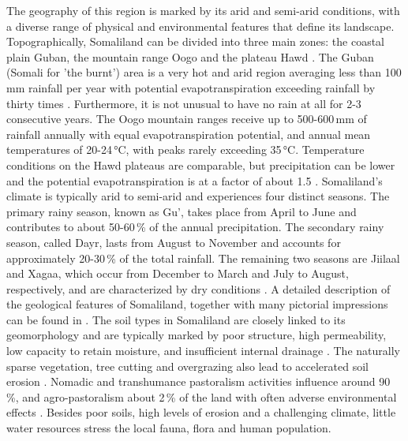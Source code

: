 {The geography of this region is marked by its arid and semi-arid conditions, with a diverse range of physical and environmental features that define its landscape. Topographically, Somaliland can be divided into three main zones: the coastal plain Guban, the mountain range Oogo and the plateau Hawd \autocite{republicofsomaliaCountryProfile20212021}. The Guban (Somali for 'the burnt') area is a very hot and arid region averaging less than 100\,mm rainfall per year with potential evapotranspiration exceeding rainfall by thirty times \autocite{salemTerritorialDiagnosticReport2016}. Furthermore, it is not unusual to have no rain at all for 2-3 consecutive years. The Oogo mountain ranges receive up to 500-600\,mm of rainfall annually with equal evapotranspiration potential, and annual mean temperatures of 20-24\,°C, with peaks rarely exceeding 35\,°C. Temperature conditions on the Hawd plateaus are comparable, but precipitation can be lower and the potential evapotranspiration is at a factor of about 1.5 \autocite{abdulkadirAssessmentDroughtRecurrence2017,salemTerritorialDiagnosticReport2016}. 
Somaliland's climate is typically arid to semi-arid and experiences four distinct seasons. The primary rainy season, known as Gu', takes place from April to June and contributes to about 50-60\,\% of the annual precipitation. The secondary rainy season, called Dayr, lasts from August to November and accounts for approximately 20-30\,\% of the total rainfall. The remaining two seasons are Jiilaal and Xagaa, which occur from December to March and July to August, respectively, and are characterized by dry conditions \autocite{abdulkadirAssessmentDroughtRecurrence2017,republicofsomaliaCountryProfile20212021}.
A detailed description of the geological features of Somaliland, together with many pictorial impressions can be found in \autocite{petrucciLandscapeLandformsNorthern2022}. The soil types in Somaliland are closely linked to its geomorphology and are typically marked by poor structure, high permeability, low capacity to retain moisture, and insufficient internal drainage \autocite{salemTerritorialDiagnosticReport2016}. The naturally sparse vegetation, tree cutting and overgrazing also lead to accelerated soil erosion \autocite{salemTerritorialDiagnosticReport2016}. Nomadic and transhumance pastoralism activities influence around 90\,\%, and agro-pastoralism about 2\,\% of the land with often adverse environmental effects \autocite{salemTerritorialDiagnosticReport2016}. Besides poor soils, high levels of erosion and a challenging climate, little water resources stress the local fauna, flora and human population. 

}
